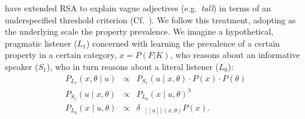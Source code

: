 \documentclass[10pt,letterpaper]{article}
\newcommand{\denote}[1]{\mbox{ $[\![ #1 ]\!]$}}
\newcommand{\mht}[1]{\textcolor{Blue}{[mht: #1]}}
\begin{document}
%
 have extended RSA to explain vague adjectives (e.g.~\emph{tall}) in terms of an underspecified threshold criterion (Cf.~). 
We follow this treatment, adopting as the underlying scale the property prevalence.
We imagine a hypothetical, pragmatic listener ($L_1$) concerned with learning the prevalence of a certain property in a certain category, $x=P(F|K)$, who reasons about an informative speaker ($S_1$), who in turn reasons about a literal listener ($L_0$):
\begin{eqnarray}
P_{L_{1}}(x , \theta \mid u) &\propto& P_{S_{1}}(u \mid x, \theta) \cdot P(x) \cdot P(\theta) \label{eq:L1}\\
P_{S_{1}}(u \mid x, \theta) &\propto&  {P_{L_{0}}(x \mid u, \theta)}^{\lambda} \label{eq:S1}\\
P_{L_{0}}(x \mid u, \theta) &\propto& {\delta_{\denote{u}(x, \theta)} P(x)}. \label{eq:L0}
\end{eqnarray}


%
\end{document}
